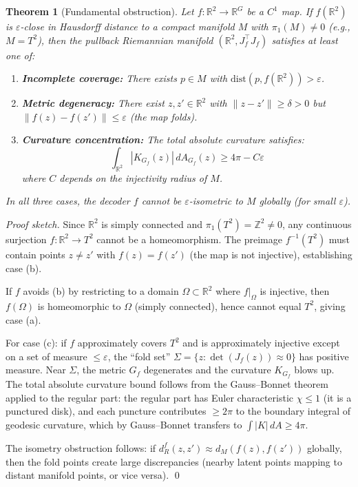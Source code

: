 \documentclass{article}
\newtheorem{theorem}{Theorem}
\begin{document}
\begin{proofbox}
\begin{theorem}[Fundamental obstruction]
\label{thm:torus_obstruction}
Let $f: \mathbb{R}^2 \to \mathbb{R}^G$ be a $C^1$ map. If $f(\mathbb{R}^2)$
is $\varepsilon$-close in Hausdorff distance to a compact manifold $M$ with
$\pi_1(M) \neq 0$ (e.g., $M = T^2$), then the pullback Riemannian manifold
$(\mathbb{R}^2, J_f^\top J_f)$ satisfies at least one of:
\begin{enumerate}
  \item[(a)] \textbf{Incomplete coverage:} There exists $p \in M$ with
    $\mathrm{dist}(p, f(\mathbb{R}^2)) > \varepsilon$.
  \item[(b)] \textbf{Metric degeneracy:} There exist $z, z' \in \mathbb{R}^2$
    with $\|z - z'\| \geq \delta > 0$ but $\|f(z) - f(z')\| \leq \varepsilon$
    (the map folds).
  \item[(c)] \textbf{Curvature concentration:} The total absolute curvature
    satisfies:
    \[
      \int_{\mathbb{R}^2} |K_{G_f}(z)|\,dA_{G_f}(z) \geq 4\pi - C\varepsilon
    \]
    where $C$ depends on the injectivity radius of $M$.
\end{enumerate}
In all three cases, the decoder $f$ cannot be $\varepsilon$-isometric to $M$
globally (for small $\varepsilon$).
\end{theorem}

\begin{proof}[Proof sketch]
Since $\mathbb{R}^2$ is simply connected and $\pi_1(T^2) = \mathbb{Z}^2 \neq 0$,
any continuous surjection $f: \mathbb{R}^2 \to T^2$ cannot be a homeomorphism.
The preimage $f^{-1}(T^2)$ must contain points $z \neq z'$ with $f(z) = f(z')$
(the map is not injective), establishing case (b).

If $f$ avoids (b) by restricting to a domain $\Omega \subset \mathbb{R}^2$
where $f|_\Omega$ is injective, then $f(\Omega)$ is homeomorphic to $\Omega$
(simply connected), hence cannot equal $T^2$, giving case (a).

For case (c): if $f$ approximately covers $T^2$ and is approximately injective
except on a set of measure $\leq \varepsilon$, the ``fold set''
$\Sigma = \{z : \det(J_f(z)) \approx 0\}$ has positive measure. Near $\Sigma$,
the metric $G_f$ degenerates and the curvature $K_{G_f}$ blows up. The total
absolute curvature bound follows from the Gauss--Bonnet theorem applied to the
regular part: the regular part has Euler characteristic $\chi \leq 1$ (it
is a punctured disk), and each puncture contributes $\geq 2\pi$ to the
boundary integral of geodesic curvature, which by Gauss--Bonnet transfers to
$\int |K|\,dA \geq 4\pi$.

The isometry obstruction follows: if $d_R^f(z, z') \approx d_M(f(z), f(z'))$
globally, then the fold points create large discrepancies (nearby latent points
mapping to distant manifold points, or vice versa). \qed
\end{proof}
\end{proofbox}
\end{document}
